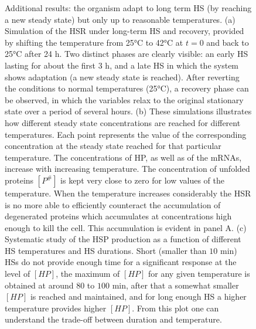 \documentclass[oneside, 10pt, a4paper, twocolumn]{article}
\begin{document}
\begin{figure}
\endminipage\hfill
\caption{\small{Additional results: the organism adapt to long term HS (by reaching a new steady state) but only up to reasonable temperatures. (a) Simulation of the HSR under long-term HS and recovery, provided by shifting the temperature from 25°C to 42°C at $t=0$ and back to 25°C after 24 h. Two distinct phases are clearly visible: an early HS lasting for about the first $3$ h, and a late HS in which the system shows adaptation (a new steady state is reached). 
After reverting the conditions to normal temperatures (25°C), a recovery phase can be observed, in which
the variables relax to the original stationary state over a period of several hours. (b) These simulations illustrates how different steady state concentrations are reached for different temperatures. Each point represents the value of the corresponding concentration at the steady state reached for that particular temperature. The concentrations of HP, as well as of the mRNAs, increase with increasing temperature. The concentration of unfolded proteins $\left[P^\#\right]$ is kept very close to zero for low values of the temperature. When the temperature increases considerably the HSR is no more able to efficiently counteract the accumulation of degenerated proteins which accumulates at concentrations high enough to kill the cell. This accumulation is evident in panel A. 
(c) Systematic study of the HSP production as a function of different HS temperatures and HS durations. Short (smaller than $10$ min) HSs do not provide enough time for a significant response at the level of $\left[HP\right]$, the maximum of $\left[HP\right]$ for any given temperature is obtained at around $80$ to $100$ min, after that a somewhat smaller $\left[HP\right]$ is reached and maintained, and for long enough HS a higher temperature provides higher $\left[HP\right]$. From this plot one can understand the trade-off between duration and temperature.}}
  \label{FigAdditionalResults}
\end{figure}
\end{document}
